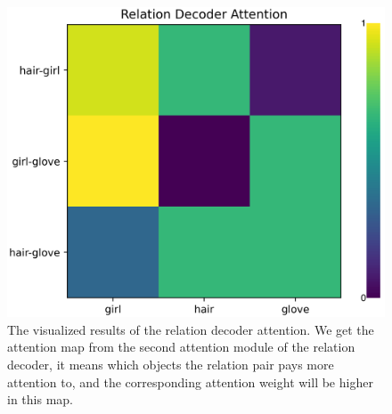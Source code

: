 \begin{figure}[h!]
{\begin{minipage}[t]{5cm}
	\centering
	\includegraphics[width=1\linewidth]{figures/result/relation_Attention/att2}
\end{minipage}
	}
	
	\caption[The visualized results of the relation decoder attention.]{The visualized results of the relation decoder attention. We get the attention map from the second attention module of the relation decoder, it means which objects the relation pair pays more attention to, and the corresponding  attention weight will be higher in this map.}
	\label{fig:relation_attetnion}
\end{figure}


